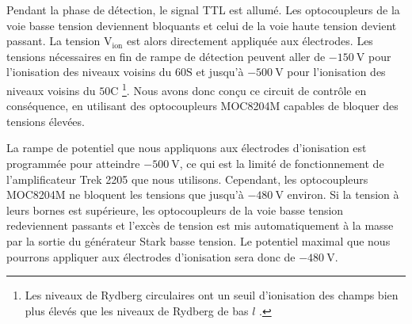 Pendant la phase de détection, le signal TTL est allumé. Les optocoupleurs de la voie basse tension deviennent bloquants et celui de la voie haute tension devient passant.
La tension $\mathrm{V_{ion}}$ est alors directement appliquée aux électrodes.
Les tensions nécessaires en fin de rampe de détection peuvent aller de $\SI{-150}{\V}$ pour l'ionisation des niveaux voisins du $\mathrm{60S}$ et jusqu'à $\SI{-500}{\V}$ pour l'ionisation des niveaux voisins du $\mathrm{50C}$ \footnote{
Les niveaux de Rydberg circulaires ont un seuil d'ionisation des champs bien plus élevés que les niveaux de Rydberg de bas $l$ \cite{TXT_GALLAGHER}.
}.
Nous avons donc conçu ce circuit de contrôle en conséquence, en utilisant des optocoupleurs MOC8204M capables de bloquer des tensions élevées.

La rampe de potentiel que nous appliquons aux électrodes d'ionisation est programmée pour atteindre $\SI{-500}{\V}$, ce qui est la limité de fonctionnement de l'amplificateur Trek 2205 que nous utilisons.
Cependant, les optocoupleurs MOC8204M ne bloquent les tensions que jusqu'à $\SI{-480}{\V}$ environ.
Si la tension à leurs bornes est supérieure, les optocoupleurs de la voie basse tension redeviennent passants et l'excès de tension est mis automatiquement à la masse par la sortie du générateur \og Stark \fg{}  basse tension.
Le potentiel maximal que nous pourrons appliquer aux électrodes d'ionisation sera donc de $\SI{-480}{\V}$.


